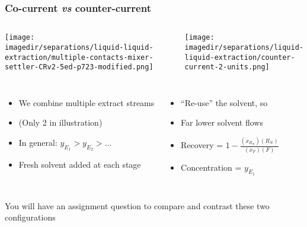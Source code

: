 \begin{frame}\frametitle{Co-current \emph{vs} counter-current}
	\begin{columns}[t]
			{\color{myGreen}{Co-current ($N=2$ stages)}} 
			{\color{myGreen}{Counter-current ($N=2$ stages)}}
	\end{columns}
	\begin{columns}[t]
			\begin{center}
				\texttt{[image: \\imagedir/separations/liquid-liquid-extraction/multiple-contacts-mixer-settler-CRv2-5ed-p723-modified.png]}
			\end{center}
			\vspace{-12pt}
			\begin{center}
				\texttt{[image: \\imagedir/separations/liquid-liquid-extraction/counter-current-2-units.png]}
			\end{center}
	\end{columns}
	
	\begin{columns}[t]
			\begin{itemize}
				\item	We combine multiple extract streams
				\item	(Only 2 in illustration)
				\item	In general: $y_{E_1} > y_{E_2} > \ldots$
				\item	Fresh solvent added at each stage
			\end{itemize}
			\begin{itemize}
				\item	``Re-use'' the solvent, so
				\item	Far lower solvent flows
				\item	Recovery = 	\(1 - \displaystyle\frac{(x_{R_N})(R_N)}{(x_F) (F)}\)
				\item	Concentration = \(\displaystyle  y_{E_1}\)
			\end{itemize}
	\end{columns}	
	\vspace{6pt}
	You will have an assignment question to compare and contrast these two configurations
\end{frame}

